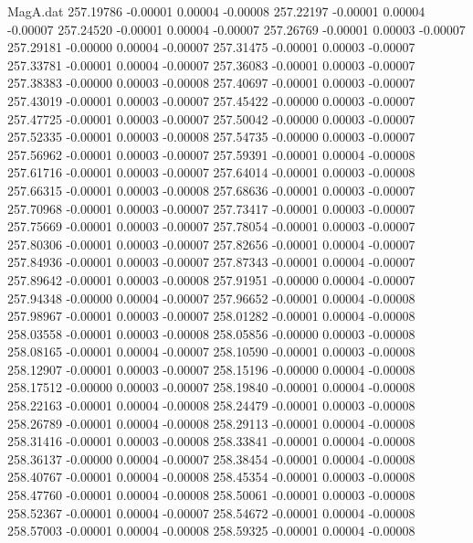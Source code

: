 \begin{filecontents}{MagA.dat}
 257.19786   -0.00001    0.00004   -0.00008
 257.22197   -0.00001    0.00004   -0.00007
 257.24520   -0.00001    0.00004   -0.00007
 257.26769   -0.00001    0.00003   -0.00007
 257.29181   -0.00000    0.00004   -0.00007
 257.31475   -0.00001    0.00003   -0.00007
 257.33781   -0.00001    0.00004   -0.00007
 257.36083   -0.00001    0.00003   -0.00007
 257.38383   -0.00000    0.00003   -0.00008
 257.40697   -0.00001    0.00003   -0.00007
 257.43019   -0.00001    0.00003   -0.00007
 257.45422   -0.00000    0.00003   -0.00007
 257.47725   -0.00001    0.00003   -0.00007
 257.50042   -0.00000    0.00003   -0.00007
 257.52335   -0.00001    0.00003   -0.00008
 257.54735   -0.00000    0.00003   -0.00007
 257.56962   -0.00001    0.00003   -0.00007
 257.59391   -0.00001    0.00004   -0.00008
 257.61716   -0.00001    0.00003   -0.00007
 257.64014   -0.00001    0.00003   -0.00008
 257.66315   -0.00001    0.00003   -0.00008
 257.68636   -0.00001    0.00003   -0.00007
 257.70968   -0.00001    0.00003   -0.00007
 257.73417   -0.00001    0.00003   -0.00007
 257.75669   -0.00001    0.00003   -0.00007
 257.78054   -0.00001    0.00003   -0.00007
 257.80306   -0.00001    0.00003   -0.00007
 257.82656   -0.00001    0.00004   -0.00007
 257.84936   -0.00001    0.00003   -0.00007
 257.87343   -0.00001    0.00004   -0.00007
 257.89642   -0.00001    0.00003   -0.00008
 257.91951   -0.00000    0.00004   -0.00007
 257.94348   -0.00000    0.00004   -0.00007
 257.96652   -0.00001    0.00004   -0.00008
 257.98967   -0.00001    0.00003   -0.00007
 258.01282   -0.00001    0.00004   -0.00008
 258.03558   -0.00001    0.00003   -0.00008
 258.05856   -0.00000    0.00003   -0.00008
 258.08165   -0.00001    0.00004   -0.00007
 258.10590   -0.00001    0.00003   -0.00008
 258.12907   -0.00001    0.00003   -0.00007
 258.15196   -0.00000    0.00004   -0.00008
 258.17512   -0.00000    0.00003   -0.00007
 258.19840   -0.00001    0.00004   -0.00008
 258.22163   -0.00001    0.00004   -0.00008
 258.24479   -0.00001    0.00003   -0.00008
 258.26789   -0.00001    0.00004   -0.00008
 258.29113   -0.00001    0.00004   -0.00008
 258.31416   -0.00001    0.00003   -0.00008
 258.33841   -0.00001    0.00004   -0.00008
 258.36137   -0.00000    0.00004   -0.00007
 258.38454   -0.00001    0.00004   -0.00008
 258.40767   -0.00001    0.00004   -0.00008
 258.45354   -0.00001    0.00003   -0.00008
 258.47760   -0.00001    0.00004   -0.00008
 258.50061   -0.00001    0.00003   -0.00008
 258.52367   -0.00001    0.00004   -0.00007
 258.54672   -0.00001    0.00004   -0.00008
 258.57003   -0.00001    0.00004   -0.00008
 258.59325   -0.00001    0.00004   -0.00008

\end{filecontents}
